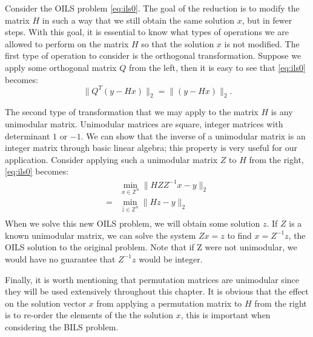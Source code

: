 \documentclass[12pt,Bold,letterpaper]{mcgilletdclass}
\begin{document}
Consider the OILS problem \eqref{eq:ils0}. The goal of the reduction is to modify the matrix $H$ in such a way that we still obtain the same solution $x$, but in fewer steps. With this goal, it is essential to know what types of operations we are allowed to perform on the matrix $H$ so that the solution $x$ is not modified. The first type of operation to consider is the orthogonal transformation. Suppose we apply some orthogonal matrix $Q$ from the left, then it is easy to see that \eqref{eq:ils0} becomes: $$ \| Q^T(y- Hx)\|_2 = \| (y- Hx) \|_2.$$ 

The second type of transformation that we may apply to the matrix $H$ is any unimodular matrix. Unimodular matrices are square, integer matrices with determinant $1$ or $-1$. We can show that the inverse of a unimodular matrix is an integer matrix through basic linear algebra; this property is very useful for our application. Consider applying such a unimodular matrix $Z$ to $H$ from the right, \eqref{eq:ils0} becomes: 
\begin{align}
&\min_{x\in {\mathbb{Z}^n }}  \| HZZ^{-1}x - y \|_2\\
=&\min_{\hat{z}\in {\mathbb{Z}^n }}  \| Hz - y \|_2\\
\end{align}
When we solve this new OILS problem, we will obtain some solution $z$. If $Z$ is a known unimodular matrix, we can solve the system $Zx = z$ to find $x = Z^{-1}z$, the OILS solution to the original problem. Note that if Z were not unimodular, we would have no guarantee that $Z^{-1}z$ would be integer.

Finally, it is worth mentioning that permutation matrices are unimodular since they will be used extensively throughout this chapter. It is obvious that the effect on the solution vector $x$ from applying a permutation matrix to $H$ from the right is to re-order the elements of the the solution $x$, this is important when considering the BILS problem.
\end{document}
